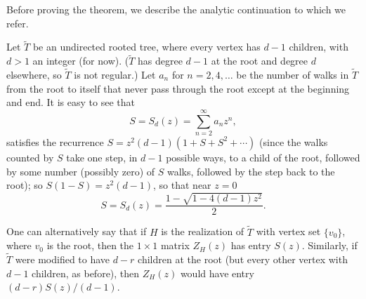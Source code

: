 \documentclass[12pt]{article}
\begin{document}
Before proving the theorem, we describe the analytic continuation to which
we refer.

Let $\widetilde T$ be an undirected rooted tree,
where every vertex has $d-1$ children, 
with $d>1$ an integer (for now).  ($\widetilde T$ has degree $d-1$ at the
root and degree $d$ elsewhere, so $\widetilde T$ is not regular.)
Let $a_n$ for $n=2,4,\ldots$ be the number of walks in $\widetilde T$
from the root to
itself that never pass through the root except at the beginning and end.
It is easy to see that
$$
S = S_d(z)= \sum_{n=2}^\infty a_n z^n,
$$
satisfies the recurrence $S=z^2(d-1)(1+S+S^2+\cdots)$ (since the walks
counted by $S$ take one step, in $d-1$ possible ways, to a child
of the root, followed by some number (possibly zero)
of $S$ walks, followed by the step back to the root); so
$S(1-S)=z^2(d-1)$, so that near $z=0$
\begin{equation}\label{eq:S_quadratic}
S=S_d(z) = \frac{1-\sqrt{1-4(d-1)z^2}}{2}.
\end{equation}

One can alternatively say that if $H$ is the realization of $\widetilde T$
with vertex set $\{v_0\}$, where $v_0$ is the root, then the $1\times 1$
matrix $Z_H(z)$ has entry $S(z)$.  Similarly, if $\widetilde T$ were
modified to have $d-r$ children at the root (but every other vertex with
$d-1$ children, as before), then $Z_H(z)$ would have entry $(d-r)S(z)/(d-1)$.
\end{document}
